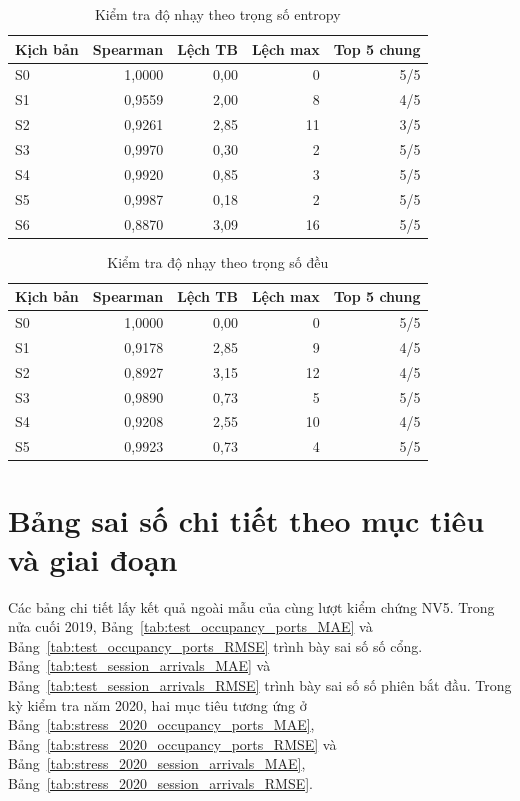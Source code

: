 \documentclass[conference,a4paper]{IEEEtran}
\begin{document}
\begin{table}[!t]
\caption{Kiểm tra độ nhạy theo trọng số entropy}
\label{tab:sensitivity_entropy}
\centering\footnotesize
\setlength{\tabcolsep}{3pt}
\begin{tabularx}{\columnwidth}{@{}Xrrrr@{}}
\toprule
\textbf{Kịch bản} & \textbf{Spearman} & \textbf{Lệch TB} & \textbf{Lệch max} & \textbf{Top 5 chung} \\
\midrule
S0 & 1,0000 & 0,00 & 0 & 5/5 \\
S1 & 0,9559 & 2,00 & 8 & 4/5 \\
S2 & 0,9261 & 2,85 & 11 & 3/5 \\
S3 & 0,9970 & 0,30 & 2 & 5/5 \\
S4 & 0,9920 & 0,85 & 3 & 5/5 \\
S5 & 0,9987 & 0,18 & 2 & 5/5 \\
S6 & 0,8870 & 3,09 & 16 & 5/5 \\
\bottomrule
\end{tabularx}
\end{table}

\begin{table}[!t]
\caption{Kiểm tra độ nhạy theo trọng số đều}
\label{tab:sensitivity_equal}
\centering\footnotesize
\setlength{\tabcolsep}{3pt}
\begin{tabularx}{\columnwidth}{@{}Xrrrr@{}}
\toprule
\textbf{Kịch bản} & \textbf{Spearman} & \textbf{Lệch TB} & \textbf{Lệch max} & \textbf{Top 5 chung} \\
\midrule
S0 & 1,0000 & 0,00 & 0 & 5/5 \\
S1 & 0,9178 & 2,85 & 9 & 4/5 \\
S2 & 0,8927 & 3,15 & 12 & 4/5 \\
S3 & 0,9890 & 0,73 & 5 & 5/5 \\
S4 & 0,9208 & 2,55 & 10 & 4/5 \\
S5 & 0,9923 & 0,73 & 4 & 5/5 \\
\bottomrule
\end{tabularx}
\end{table}


\section{Bảng sai số chi tiết theo mục tiêu và giai đoạn}
Các bảng chi tiết lấy kết quả ngoài mẫu của cùng lượt kiểm chứng NV5. Trong nửa cuối 2019, Bảng~\ref{tab:test_occupancy_ports_MAE} và Bảng~\ref{tab:test_occupancy_ports_RMSE} trình bày sai số số cổng. Bảng~\ref{tab:test_session_arrivals_MAE} và Bảng~\ref{tab:test_session_arrivals_RMSE} trình bày sai số số phiên bắt đầu. Trong kỳ kiểm tra năm 2020, hai mục tiêu tương ứng ở Bảng~\ref{tab:stress_2020_occupancy_ports_MAE}, Bảng~\ref{tab:stress_2020_occupancy_ports_RMSE} và Bảng~\ref{tab:stress_2020_session_arrivals_MAE}, Bảng~\ref{tab:stress_2020_session_arrivals_RMSE}.
\end{document}
